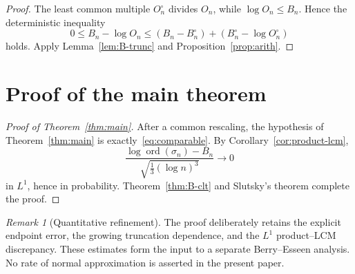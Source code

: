 \documentclass[11pt]{article}
\theoremstyle{remark}
\newtheorem{remark}[theorem]{Remark}
\newcommand{\ord}{\operatorname{ord}}
\begin{document}
\begin{proof}
The least common multiple $O_n^\circ$ divides $O_n$, while
$\log O_n\leq B_n$.  Hence the deterministic inequality
\begin{equation}\label{eq:restore-direct}
 0\leq B_n-\log O_n
 \leq(B_n-B_n^\circ)+(B_n^\circ-\log O_n^\circ)
\end{equation}
holds.  Apply Lemma~\ref{lem:B-trunc} and
Proposition~\ref{prop:arith}.
\end{proof}

\section{Proof of the main theorem}

\begin{proof}[Proof of Theorem~\ref{thm:main}]
After a common rescaling, the hypothesis of Theorem~\ref{thm:main} is
exactly~\eqref{eq:comparable}.  By Corollary~\ref{cor:product-lcm},
\[
 \frac{\log\ord(\sigma_n)-B_n}{\sqrt{\frac13(\log n)^3}}
 \longrightarrow0
\]
in $L^1$, hence in probability.  Theorem~\ref{thm:B-clt} and Slutsky's
theorem complete the proof.
\end{proof}

\begin{remark}[Quantitative refinement]
The proof deliberately retains the explicit endpoint error, the growing
truncation dependence, and the $L^1$ product--LCM discrepancy.  These
estimates form the input to a separate Berry--Esseen analysis.  No rate of
normal approximation is asserted in the present paper.
\end{remark}
\end{document}
